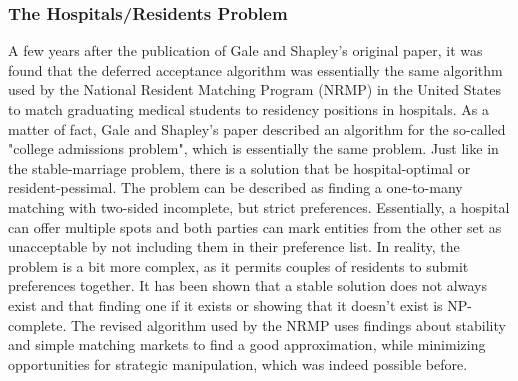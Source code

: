 \subsubsection{The Hospitals/Residents Problem}
A few years after the publication of Gale and Shapley's original paper, it was found that the deferred acceptance algorithm was essentially the same algorithm used by the National Resident Matching Program (NRMP) in the United States to match graduating medical students to residency positions in hospitals.\cite{Gusfield} As a matter of fact, Gale and Shapley's paper described an algorithm for the so-called "college admissions problem"\cite{GaleShapleyOrig}, which is essentially the same problem. Just like in the stable-marriage problem, there is a solution that be hospital-optimal or resident-pessimal. 
\newline
The problem can be described as finding a one-to-many matching with two-sided incomplete, but strict preferences. Essentially, a hospital can offer multiple spots and both parties can mark entities from the other set as unacceptable by not including them in their preference list.\cite{RePEc:ris:nobelp:2012_005} 
\newline
In reality, the problem is a bit more complex, as it permits couples of residents to submit preferences together. It has been shown that a stable solution does not always exist and that finding one if it exists or showing that it doesn't exist is NP-complete.\cite{RONN1990285} The revised algorithm used by the NRMP uses findings about stability and simple matching markets to find a good approximation, while minimizing opportunities for strategic manipulation, which was indeed possible before.\cite{NBERw6963}

